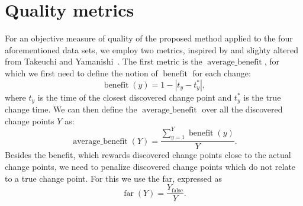 \section{Quality metrics}\label{sec:artificial_data_quality_metrics}
For an objective measure of quality of the proposed method applied to the four aforementioned data sets, we employ two metrics, inspired by and slighty altered from Takeuchi and Yamanishi~\cite{takeuchi2006unifying}.
The first metric is the $\operatorname*{average \_ benefit}$, for which we first need to define the notion of $\operatorname*{benefit}$ for each change:
\begin{equation}\label{eq:benefit}
  \operatorname*{benefit}(y) = 1 - |t_y - t_y^*|,
\end{equation}
where $t_y$ is the time of the closest discovered change point and $t_y^*$ is the true change time.
We can then define the $\operatorname*{average \_ benefit}$ over all the discovered change points $Y$ as:
\begin{equation}\label{eq:average_benefit}
  \operatorname*{average \_ benefit}(Y) = \frac{\sum_{y=1}^Y \operatorname*{benefit}(y)}{Y}.
\end{equation}
Besides the benefit, which rewards discovered change points close to the actual change points, we need to penalize discovered change points which do not relate to a true change point.
For this we use the \acrlong{far}, expressed as
\begin{equation}\label{eq:false_alarm_rate}
  \operatorname*{far}(Y) = \frac{Y_{\operatorname*{false}}}{Y}.
\end{equation}

